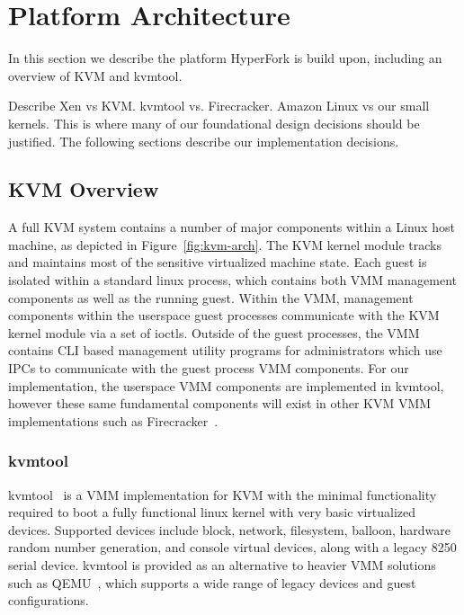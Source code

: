 
\section{Platform Architecture} \label{sec:design}

In this section we describe the platform HyperFork is build upon, including an overview of KVM and kvmtool.



Describe Xen vs KVM. kvmtool vs. Firecracker. Amazon Linux vs our small
kernels. This is where many of our foundational design decisions should be
justified. The following sections describe our implementation decisions.

\subsection{KVM Overview}

A full KVM system contains a number of major components within a Linux host
machine, as depicted in Figure~\ref{fig:kvm-arch}. The KVM kernel module tracks
and maintains most of the sensitive virtualized machine state. Each guest is
isolated within a standard linux process, which contains both VMM management components
as well as the running guest. Within the VMM, management components within the
userspace guest processes communicate with the KVM kernel module via a set of
ioctls. Outside of the guest processes, the VMM contains CLI based management
utility programs for administrators which use IPCs to communicate with the
guest process VMM components. For our implementation, the userspace VMM
components are implemented in kvmtool, however these same fundamental
components will exist in other KVM VMM implementations such as
Firecracker~\cite{firecracker}.

\begin{figure*}[t]
  \texttt{[image: \{figures/kvm-arch]}}
  \caption{KVM Software Architecture}
  \label{fig:kvm-arch}
\end{figure*}

\subsubsection{kvmtool}

kvmtool~\cite{kvmtool} is a VMM implementation for KVM with the minimal
functionality required to boot a fully functional linux kernel with very basic
virtualized devices. Supported devices include block, network, filesystem,
balloon, hardware random number generation, and console virtual devices, along
with a legacy 8250 serial device. kvmtool is provided as an alternative to
heavier VMM solutions such as QEMU~\cite{qemu}, which supports a wide range of
legacy devices and guest configurations.

